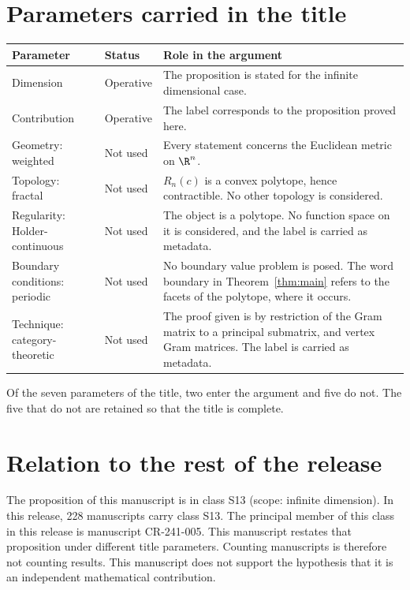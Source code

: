 \documentclass[11pt]{article}
\begin{document}
\section{Parameters carried in the title}\label{sec:params}
\begin{center}
\small
\begin{tabular}{p{}p{}p{}}
\toprule
Parameter & Status & Role in the argument \\
\midrule
Dimension & Operative & The proposition is stated for the infinite dimensional case. \\
Contribution & Operative & The label corresponds to the proposition proved here. \\
Geometry: weighted & Not used & Every statement concerns the Euclidean metric on $\R^n$. \\
Topology: fractal & Not used & $R_n(c)$ is a convex polytope, hence contractible. No other topology is considered. \\
Regularity: Holder-continuous & Not used & The object is a polytope. No function space on it is considered, and the label is carried as metadata. \\
Boundary conditions: periodic & Not used & No boundary value problem is posed. The word boundary in Theorem~\ref{thm:main} refers to the facets of the polytope, where it occurs. \\
Technique: category-theoretic & Not used & The proof given is by restriction of the Gram matrix to a principal submatrix, and vertex Gram matrices. The label is carried as metadata. \\
\bottomrule
\end{tabular}
\end{center}
Of the seven parameters of the title, two enter the argument and five do not. The five that do not are retained so that the title is complete.

\section{Relation to the rest of the release}
The proposition of this manuscript is in class S13 (scope: infinite dimension).
In this release, 228 manuscripts carry class S13. The principal member of this class in this release is manuscript CR-241-005. This manuscript restates that proposition under different title parameters.
Counting manuscripts is therefore not counting results. This manuscript does not support the hypothesis that it is an independent mathematical contribution.
\end{document}
